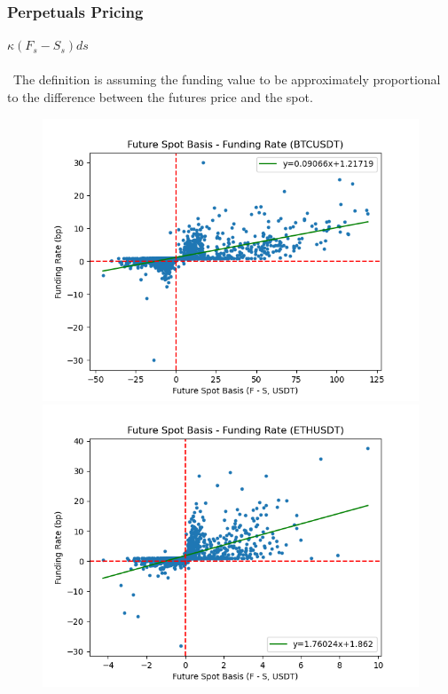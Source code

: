 \documentclass{beamer}
\begin{document}
\begin{frame}
\frametitle{Perpetuals Pricing}
$\kappa(F_s-S_s)ds$\\~\\
~The definition is assuming the funding value to be approximately proportional to the difference between the futures price and the spot. 
\begin{figure}
\includegraphics[scale=0.35]{figs/Future Spot Basis - Funding Rate/Future Spot Basis - Funding Rate (BTCUSDT).png}
\includegraphics[scale=0.35]{figs/Future Spot Basis - Funding Rate/Future Spot Basis - Funding Rate (ETHUSDT).png}
\end{figure}
\end{frame}
\end{document}
